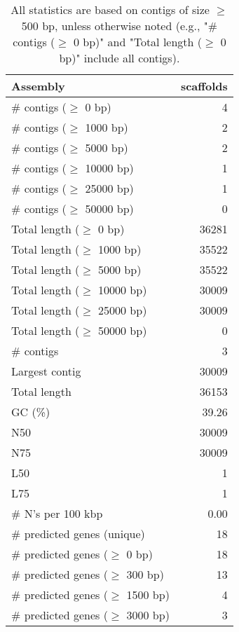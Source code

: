 \documentclass[12pt,a4paper]{article}
\begin{document}
\begin{table}[ht]
\begin{center}
\caption{All statistics are based on contigs of size $\geq$ 500 bp, unless otherwise noted (e.g., "\# contigs ($\geq$ 0 bp)" and "Total length ($\geq$ 0 bp)" include all contigs).}
\begin{tabular}{|l*{1}{|r}|}
\hline
Assembly & scaffolds \\ \hline
\# contigs ($\geq$ 0 bp) & 4 \\ \hline
\# contigs ($\geq$ 1000 bp) & 2 \\ \hline
\# contigs ($\geq$ 5000 bp) & 2 \\ \hline
\# contigs ($\geq$ 10000 bp) & 1 \\ \hline
\# contigs ($\geq$ 25000 bp) & 1 \\ \hline
\# contigs ($\geq$ 50000 bp) & 0 \\ \hline
Total length ($\geq$ 0 bp) & 36281 \\ \hline
Total length ($\geq$ 1000 bp) & 35522 \\ \hline
Total length ($\geq$ 5000 bp) & 35522 \\ \hline
Total length ($\geq$ 10000 bp) & 30009 \\ \hline
Total length ($\geq$ 25000 bp) & 30009 \\ \hline
Total length ($\geq$ 50000 bp) & 0 \\ \hline
\# contigs & 3 \\ \hline
Largest contig & 30009 \\ \hline
Total length & 36153 \\ \hline
GC (\%) & 39.26 \\ \hline
N50 & 30009 \\ \hline
N75 & 30009 \\ \hline
L50 & 1 \\ \hline
L75 & 1 \\ \hline
\# N's per 100 kbp & 0.00 \\ \hline
\# predicted genes (unique) & 18 \\ \hline
\# predicted genes ($\geq$ 0 bp) & 18 \\ \hline
\# predicted genes ($\geq$ 300 bp) & 13 \\ \hline
\# predicted genes ($\geq$ 1500 bp) & 4 \\ \hline
\# predicted genes ($\geq$ 3000 bp) & 3 \\ \hline
\end{tabular}
\end{center}
\end{table}
\end{document}
